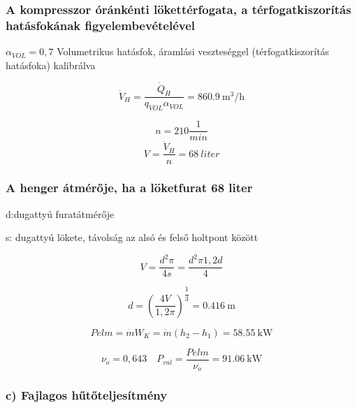 \subsubsection*{A kompresszor óránkénti lökettérfogata, a térfogatkiszorítás hatásfokának figyelembevételével}

\noindent $ {\alpha}_{VOL} = 0,7 $ Volumetrikus hatásfok, áramlási veszteséggel (térfogatkiszorítás hatásfoka) kalibrálva

\begin{equation}
    {\dot{V}}_{H}= \dfrac{{\dot{Q}}_H}{{q}_{VOL} {\alpha}_{VOL}} = \SI{860,9}{\meter\cubed\per\hour}
\end{equation}

\begin{equation}
   n=210 \dfrac{1}{min}
\end{equation}
\begin{equation}
    V = \dfrac{{\dot{V}}_{H}}{n} = \SI{68}{liter} 
\end{equation}

\subsubsection*{A henger átmérője, ha a löketfurat 68 liter}

 \noindent d:dugattyú furatátmérője
 
 \noindent s: dugattyú lökete, távolság az alsó és felső holtpont között
 
\begin{equation}
    V=\dfrac{d^2 \pi}{4 s} = \dfrac{d^2\pi 1,2d}{4}
\end{equation}

\begin{equation}
     d =\left(\dfrac{4V}{1,2\pi}\right)^{\dfrac{1}{3}} = \SI{0,416}{\meter} 
\end{equation}

\begin{equation}
     Pelm=\dot{m}  W_K = \dot{m} (h_2 - h_1)= \SI{58,55}{\kilo\watt }
\end{equation}

\begin{equation}
     \nu_o = 0,643
     \quad
     {P}_{val} = \dfrac{Pelm}{\nu_o} = \SI{91,06}{\kilo\watt }
\end{equation}

\subsubsection* { c) Fajlagos hűtőteljesítmény }

